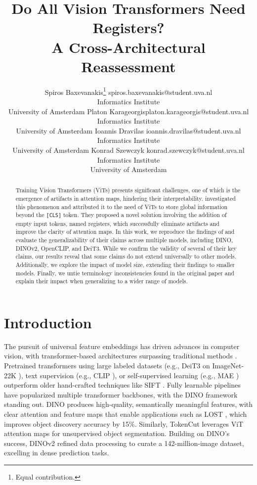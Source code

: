 \documentclass[10pt]{article} \usepackage[preprint]{tmlr}
\title{\centering Do All Vision Transformers Need Registers?\\A Cross-Architectural Reassessment}
\author{\name Spiros Baxevanakis\thanks{Equal contribution.} \email spiros.baxevanakis@student.uva.nl \\
      \addr Informatics Institute\\
      University of Amsterdam
      \AND
      \name Platon Karageorgis\footnotemark[1] \email platon.karageorgis@student.uva.nl \\
      \addr Informatics Institute\\
      University of Amsterdam
      \AND
      \name Ioannis Dravilas \email ioannis.dravilas@student.uva.nl \\
      \addr Informatics Institute\\
      University of Amsterdam
      \AND
      \name Konrad Szewczyk \email konrad.szewczyk@student.uva.nl \\
      \addr Informatics Institute\\
      University of Amsterdam}
\begin{document}
\maketitle

\begin{abstract}
Training Vision Transformers (ViTs) presents significant challenges, one of which is the emergence of artifacts in attention maps, hindering their interpretability. \citet{darcet2024registers} investigated this phenomenon and attributed it to the need of ViTs to store global information beyond the \texttt{[CLS]} token. They proposed a novel solution involving the addition of empty input tokens, named registers, which successfully eliminate artifacts and improve the clarity of attention maps. In this work, we reproduce the findings of \citet{darcet2024registers} and evaluate the generalizability of their claims across multiple models, including DINO, DINOv2, OpenCLIP, and DeiT3. While we confirm the validity of several of their key claims, our results reveal that some claims do not extend universally to other models. Additionally, we explore the impact of model size, extending their findings to smaller models. Finally, we untie terminology inconsistencies found in the original paper and explain their impact when generalizing to a wider range of models.
\end{abstract}

\section{Introduction}
The pursuit of universal feature embeddings has driven advances in computer vision, with transformer-based architectures surpassing traditional methods \citep{vaswani2023attentionneed}. Pretrained transformers using large labeled datasets (e.g., DeiT3 on ImageNet-22K \citep{touvron2022deit}), text supervision (e.g., CLIP \citep{radford2021clip}), or self-supervised learning (e.g., MAE \citep{he2021mae}) outperform older hand-crafted techniques like SIFT \citep{lowe2004distinctive}. Fully learnable pipelines have popularized multiple transformer backbones, with the DINO framework \citep{Caron2021dino} standing out. DINO produces high-quality, semantically meaningful features, with clear attention and feature maps that enable applications such as LOST \citep{simeoni2021lost}, which improves object discovery accuracy by 15\%. Similarly, TokenCut \citep{wang2022selfsupervisedtransformersunsupervisedobject} leverages ViT attention maps for unsupervised object segmentation. Building on DINO’s success, DINOv2 \citep{oquab2023dinov2} refined data processing to curate a 142-million-image dataset, excelling in dense prediction tasks.
\end{document}
